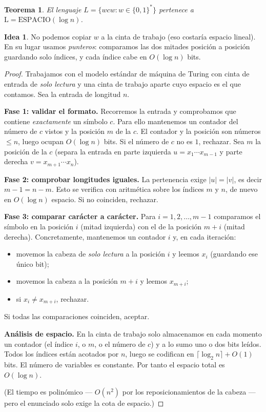 \documentclass[11pt,a4paper]{article}
\theoremstyle{plain}
\newtheorem{teorema}{Teorema}
\theoremstyle{definition}
\newtheorem*{idea}{Idea}
\newcommand{\Lclass}{\mathrm{L}}
\newcommand{\SPACE}{\mathrm{ESPACIO}}
\begin{document}
\begin{teorema}
El lenguaje $L=\{wcw : w\in\{0,1\}^{*}\}$ pertenece a
$\Lclass=\SPACE(\log n)$.
\end{teorema}

\begin{idea}
No podemos copiar $w$ a la cinta de trabajo (eso costar\'ia espacio lineal). En su
lugar usamos \emph{punteros}: comparamos las dos mitades posici\'on a posici\'on
guardando solo \'indices, y cada \'indice cabe en $O(\log n)$ bits.
\end{idea}

\begin{proof}
Trabajamos con el modelo est\'andar de m\'aquina de Turing con cinta de entrada de
\emph{solo lectura} y una cinta de trabajo aparte cuyo espacio es el que contamos.
Sea la entrada de longitud $n$.

\textbf{Fase 1: validar el formato.} Recorremos la entrada y comprobamos que contiene
\emph{exactamente} un s\'imbolo $c$. Para ello mantenemos un contador del n\'umero de
$c$ vistos y la posici\'on $m$ de la $c$. El contador y la posici\'on son n\'umeros
$\leq n$, luego ocupan $O(\log n)$ bits. Si el n\'umero de $c$ no es $1$, rechazar.
Sea $m$ la posici\'on de la $c$ (separa la entrada en parte izquierda
$u=x_1\cdots x_{m-1}$ y parte derecha $v=x_{m+1}\cdots x_{n}$).

\textbf{Fase 2: comprobar longitudes iguales.} La pertenencia exige $|u|=|v|$, es
decir $m-1 = n-m$. Esto se verifica con aritm\'etica sobre los \'indices $m$ y $n$,
de nuevo en $O(\log n)$ espacio. Si no coinciden, rechazar.

\textbf{Fase 3: comparar car\'acter a car\'acter.} Para
$i=1,2,\dots,m-1$ comparamos el s\'imbolo en la posici\'on $i$ (mitad izquierda) con
el de la posici\'on $m+i$ (mitad derecha). Concretamente, mantenemos un contador $i$
y, en cada iteraci\'on:
\begin{itemize}[nosep]
  \item movemos la cabeza de \emph{solo lectura} a la posici\'on $i$ y leemos
        $x_i$ (guardando ese \'unico bit);
  \item movemos la cabeza a la posici\'on $m+i$ y leemos $x_{m+i}$;
  \item si $x_i\neq x_{m+i}$, rechazar.
\end{itemize}
Si todas las comparaciones coinciden, aceptar.

\textbf{An\'alisis de espacio.} En la cinta de trabajo solo almacenamos en cada
momento un contador (el \'indice $i$, o $m$, o el n\'umero de $c$) y a lo sumo uno o
dos bits le\'idos. Todos los \'indices est\'an acotados por $n$, luego se codifican en
$\lceil\log_2 n\rceil + O(1)$ bits. El n\'umero de variables es constante. Por tanto
el espacio total es $O(\log n)$.

(El tiempo es polin\'omico --- $O(n^2)$ por los reposicionamientos de la cabeza ---
pero el enunciado solo exige la cota de espacio.)
\end{proof}
\end{document}

